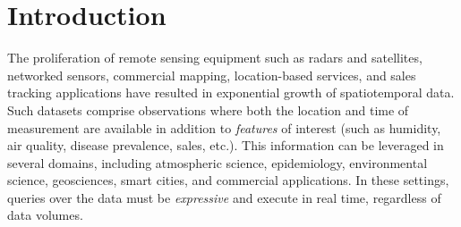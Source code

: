 \section{Introduction}
\label{sec:introduction}
The proliferation of remote sensing equipment such as radars and satellites, networked sensors, commercial mapping, location-based services, and sales tracking applications have resulted in exponential growth of spatiotemporal data. Such datasets comprise observations where both the location and time of measurement are available in addition to \emph{features} of interest (such as humidity, air quality, disease prevalence, sales, etc.). This information can be leveraged in several domains, including atmospheric science, epidemiology, environmental science, geosciences, smart cities, and commercial applications. In these settings, queries over the data must be \emph{expressive} and execute in real time, regardless of data volumes.

